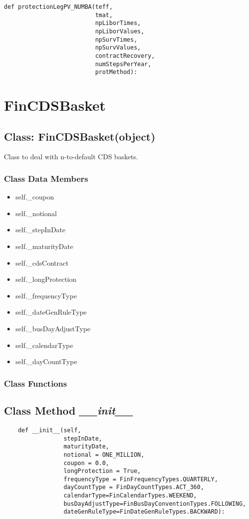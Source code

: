 \documentclass[twoside,11pt]{book}
\begin{document}
\begin{lstlisting}
def protectionLegPV_NUMBA(teff,
                          tmat,
                          npLiborTimes,
                          npLiborValues,
                          npSurvTimes,
                          npSurvValues,
                          contractRecovery,
                          numStepsPerYear,
                          protMethod):
\end{lstlisting}

\newpage
\section{FinCDSBasket}

\subsection{Class: FinCDSBasket(object)}
Class to deal with n-to-default CDS baskets. 

\subsubsection{Class Data Members}
\begin{itemize}
\item{self.\_coupon}
\item{self.\_notional}
\item{self.\_stepInDate}
\item{self.\_maturityDate}
\item{self.\_cdsContract}
\item{self.\_longProtection}
\item{self.\_frequencyType}
\item{self.\_dateGenRuleType}
\item{self.\_busDayAdjustType}
\item{self.\_calendarType}
\item{self.\_dayCountType}
\end{itemize}

\subsubsection{Class Functions}

\subsection{Class Method {\it \_\_init\_\_}}


\begin{lstlisting}
    def __init__(self, 
                 stepInDate,
                 maturityDate, 
                 notional = ONE_MILLION, 
                 coupon = 0.0, 
                 longProtection = True,
                 frequencyType = FinFrequencyTypes.QUARTERLY,
                 dayCountType = FinDayCountTypes.ACT_360,
                 calendarType=FinCalendarTypes.WEEKEND,
                 busDayAdjustType=FinBusDayConventionTypes.FOLLOWING,
                 dateGenRuleType=FinDateGenRuleTypes.BACKWARD):
\end{lstlisting}
\end{document}
